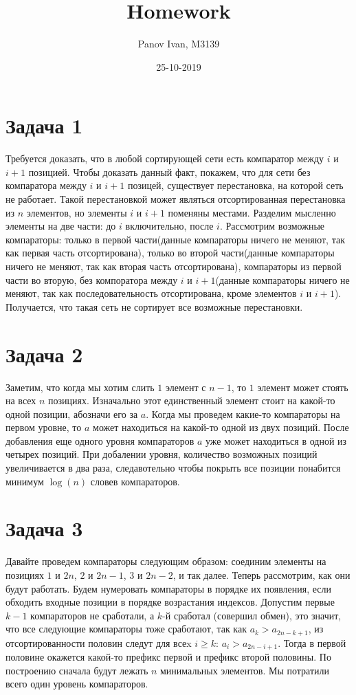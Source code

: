 \documentclass{article}
\title{Homework}
\date{25-10-2019}
\author{Panov Ivan, M3139}
\begin{document}
	
	\maketitle
	\newpage
	
	\section*{Задача 1}
	Требуется доказать, что в любой сортирующей сети есть компаратор между $i$ и $i + 1$ позицией. Чтобы доказать данный факт, покажем, что для сети без компаратора между $i$ и $i + 1$ позицей, существует перестановка, на которой сеть не работает. Такой перестановкой может являться отсортированная перестановка из $n$ элементов, но элементы $i$ и $i + 1$ поменяны местами. Разделим мысленно элементы на две части: до $i$ включительно, после $i$. Рассмотрим возможные компараторы: только в первой части(данные компараторы ничего не меняют, так как первая часть отсортирована), только во второй части(данные компараторы ничего не меняют, так как вторая часть отсортирована), компараторы из первой части во вторую, без компоратора между $i$ и $i + 1$(данные компараторы ничего не меняют, так как последовательность отсортирована, кроме элементов $i$ и $i + 1$). Получается, что такая сеть не сортирует все возможные перестановки.
	
	\section*{Задача 2}
	Заметим, что когда мы хотим слить $1$ элемент с $n - 1$, то $1$ элемент может стоять на всех $n$ позициях. Изначально этот единственный элемент стоит на какой-то одной позиции, абозначи его за $a$. Когда мы проведем какие-то компараторы на первом уровне, то $a$ может находиться на какой-то одной из двух позиций. После добавления еще одного уровня компараторов $a$ уже может находиться в одной из четырех позиций. При добалении уровня, количество возможных позиций увеличивается в два раза, следавотельно чтобы покрыть все позиции понабится минимум $\log(n)$ словев компараторов.
	
	\section*{Задача 3}
	Давайте проведем компараторы следующим образом: соединим элементы на позициях $1$ и $2n$, $2$ и $2n - 1$, $3$ и $2n - 2$, и так далее. Теперь рассмотрим, как они будут работать. Будем нумеровать компараторы в порядке их появления, если обходить входные позиции в порядке возрастания индексов. Допустим первые $k - 1$ компараторов не сработали, а $k$-й сработал (совершил обмен), это значит, что все следующие компараторы тоже сработают, так как $a_k > a_{2n-k + 1}$, из отсортированности половин следут для всеx $i \ge k$: $a_i > a_{2n-i+1}$. Тогда в первой половине окажется какой-то префикс первой и префикс второй половины. По построению сначала будут лежать $n$ минимальных элементов. Мы потратили всего один уровень компараторов.
	
	
\end{document}
